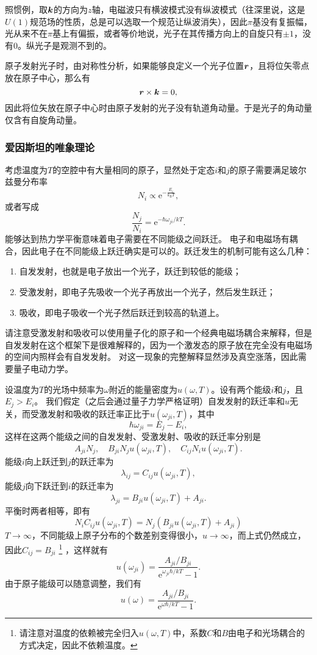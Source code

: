 \documentclass[UTF8, a4paper]{ctexart}
\newcommand*{\ee}{\mathrm{e}}
\begin{document}
照惯例，取$\vb*{k}$的方向为$z$轴，电磁波只有横波模式没有纵波模式（往深里说，这是$U(1)$规范场的性质，总是可以选取一个规范让纵波消失），因此$\pi$基没有复振幅，光从来不在$\pi$基上有偏振，或者等价地说，光子在其传播方向上的自旋只有$\pm 1$，没有$0$。纵光子是观测不到的。

原子发射光子时，由对称性分析，如果能够良定义一个光子位置$\vb*{r}$，且将位矢零点放在原子中心，那么有
\[
    \vb*{r} \times \vb*{k} = 0,
\]
因此将位矢放在原子中心时由原子发射的光子没有轨道角动量。于是光子的角动量仅含有自旋角动量。

\subsubsection{爱因斯坦的唯象理论}

考虑温度为$T$的空腔中有大量相同的原子，显然处于定态$i$和$j$的原子需要满足玻尔兹曼分布率
\[
    N_i \propto \ee^{-\frac{E_i}{k_\text{B} T}},
\]
或者写成
\[
    \frac{N_j}{N_i} = \ee^{-\hbar \omega_{ji} / kT}.
\]
能够达到热力学平衡意味着电子需要在不同能级之间跃迁。
电子和电磁场有耦合，因此电子在不同能级上跃迁确实是可以的。跃迁发生的机制可能有这么几种：
\begin{enumerate}
    \item 自发发射，也就是电子放出一个光子，跃迁到较低的能级；
    \item 受激发射，即电子先吸收一个光子再放出一个光子，然后发生跃迁；
    \item 吸收，即电子吸收一个光子然后跃迁到较高的轨道上。
\end{enumerate}
请注意受激发射和吸收可以使用量子化的原子和一个经典电磁场耦合来解释，但是自发发射在这个框架下是很难解释的，因为一个激发态的原子放在完全没有电磁场的空间内照样会有自发发射。
对这一现象的完整解释显然涉及真空涨落，因此需要量子电动力学。

设温度为$T$的光场中频率为$\omega$附近的能量密度为$u(\omega, T)$。设有两个能级$i$和$j$，且$E_j > E_i$。
我们假定（之后会通过量子力学严格证明）自发发射的跃迁率和$u$无关，而受激发射和吸收的跃迁率正比于$u(\omega_{ji}, T)$，其中
\begin{equation}
    \hbar \omega_{ji} = E_j - E_i,
    \label{eq:photon-energy}
\end{equation}
这样在这两个能级之间的自发发射、受激发射、吸收的跃迁率分别是
\[
    A_{ji} N_j, \quad B_{ji} N_j u(\omega_{ji}, T), \quad C_{ij} N_i u(\omega_{ji}, T).
\]
能级$i$向上跃迁到$j$的跃迁率为
\[
    \lambda_{ij} = C_{ij} u(\omega_{ji}, T),
\]
能级$j$向下跃迁到$i$的跃迁率为
\[
    \lambda_{ji} = B_{ji} u(\omega_{ji}, T) + A_{ji}.
\]
平衡时两者相等，即有
\[
    N_i C_{ij} u(\omega_{ji}, T) = N_j (B_{ji} u(\omega_{ji}, T) + A_{ji})
\]
$T \to \infty$，不同能级上原子分布的个数差别变得很小，$u \to \infty$，而上式仍然成立，因此$C_{ij} = B_{ji}$%
\footnote{请注意对温度的依赖被完全归入$u(\omega, T)$中，系数$C$和$B$由电子和光场耦合的方式决定，因此不依赖温度。}%
，这样就有
\[
    u(\omega_{ji}) = \frac{A_{ji} / B_{ji}}{\ee^{\omega_{ji} \hbar / k T} - 1}.
\]
由于原子能级可以随意调整，我们有
\[
    u(\omega) = \frac{A_{ji} / B_{ji}}{\ee^{\omega \hbar / k T} - 1}.
\]
\end{document}
